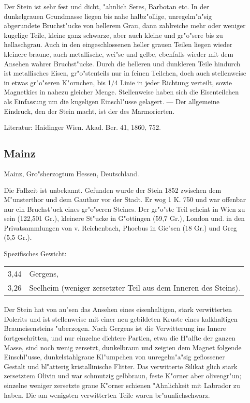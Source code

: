 \documentclass[a4paper, 11pt, oneside]{article}
\begin{document}
Der Stein ist sehr fest und dicht, "ahnlich Seres, Barbotan etc. In der dunkelgrauen Grundmasse liegen bis nahe halbz"ollige, unregelm"a"sig abgerundete Bruchst"ucke von hellerem Grau, dann zahlreiche mehr oder weniger kugelige Teile, kleine ganz schwarze, aber auch kleine und gr"o"sere bis zu hellaschgrau. Auch in den eingeschlossenen heller grauen Teilen liegen wieder kleinere braune, auch metallische, wei"se und gelbe, ebenfalls wieder mit dem Ansehen wahrer Bruchst"ucke. Durch die helleren und dunkleren Teile hindurch ist metallisches Eisen, gr"o"stenteils nur in feinen Teilchen, doch auch stellenweise in etwas gr"o"seren K"ornchen, bis 1/4 Linie in jeder Richtung verteilt, sowie Magnetkies in nahezu gleicher Menge. Stellenweise haben sich die Eisenteilchen als Einfassung um die kugeligen Einschl"usse gelagert. --- Der allgemeine Eindruck, den der Stein macht, ist der des Marmorierten.

Literatur: Haidinger Wien. Akad. Ber. 41, 1860, 752.

\subsection{Mainz}

Mainz, Gro"sherzogtum Hessen, Deutschland.

Die Fallzeit ist unbekannt. Gefunden wurde der Stein 1852 zwischen dem M"unsterthor und dem Gauthor vor der Stadt. Er wog 1 K. 750 und war offenbar nur ein Bruchst"uck eines gr"o"seren Steines. Der gr"o"ste Teil scheint in Wien zu sein (122,501 Gr.), kleinere St"ucke in G"ottingen (59,7 Gr.), London und. in den Privatsammlungen von v. Reichenbach, Phoebus in Gie"sen (18 Gr.) und Greg (5,5 Gr.).

Spezifisches Gewicht:  
\begin{table}[!ht]
    \centering
    \begin{tabular}{l l}
        3,44 & Gergens,\\
        3,26 & Seelheim (weniger zersetzter Teil aus dem Inneren des Steins).
    \end{tabular}
\end{table}
\paragraph{}
Der Stein hat von au"sen das Ansehen eines eisenhaltigen, stark verwitterten Dolerits und ist stellenweise mit einer neu gebildeten Kruste eines kalkhaltigen Brauneisensteins "uberzogen. Nach Gergens ist die Verwitterung ins Innere fortgeschritten, und nur einzelne dichtere Partien, etwa die H"alfte der ganzen Masse, sind noch wenig zersetzt, dunkelbraun und zeigten dem Magnet folgende Einschl"usse, dunkelstahlgraue Kl"umpchen von unregelm"a"sig geflossener Gestalt und bl"atterig kristallinische Flitter. Das verwitterte Silikat glich stark zersetztem Olivin und war schmutzig gelbbraun, feste K"orner aber olivengr"un; einzelne weniger zersetzte graue K"orner schienen "Ahnlichkeit mit Labrador zu haben. Die am wenigsten verwitterten Teile waren br"aunlichschwarz.
\end{document}
